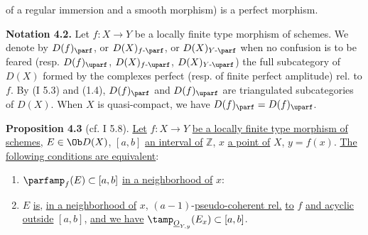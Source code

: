 %
of a regular immersion and a smooth morphism) is a perfect morphism.

\textbf{Notation 4.2.} Let \(f:X\to Y\) be a locally finite type morphism of schemes. We denote by \(D(f)_{\parf}\), or \(D(X)_{f\text{-}\parf}\), or \(D(X)_{Y\text{-}\parf}\) when no confusion is to be feared (resp. \(D(f)_{\uparf}\), \(D(X)_{f\text{-}\uparf}\), \(D(X)_{Y\text{-}\uparf}\)) the full subcategory of \(D(X)\) formed by the complexes perfect (resp. of finite perfect amplitude) rel. to \(f\). By (I 5.3) and (1.4), \(D(f)_{\parf}\) and \(D(f)_{\uparf}\) are triangulated subcategories of \(D(X)\). When \(X\) is quasi-compact, we have \(D(f)_{\parf}=D(f)_{\uparf}\).

\textbf{Proposition 4.3} (cf. I 5.8). \uline{Let} \(f:X\to Y\) \uline{be a locally finite type morphism of schemes}, \(E\in\Ob D(X)\), \([a,b]\) \uline{an interval of} \(\mathbb Z\), \(x\) \uline{a point of} \(X\), \(y=f(x)\). \uline{The following conditions are equivalent}:
\begin{enumerate}[label=(\roman*)]
\item \(\parfamp_f(E)\subset[a,b]\) \uline{in a neighborhood of} \(x\):
\item \(E\) \uline{is}, \uline{in a neighborhood of} \(x\), \((a-1)\)-\uline{pseudo-coherent rel.} \uline{to} \(f\) \uline{and acyclic outside} \([a,b]\), \uline{and we have} \(\tamp_{\underline{O}_{Y,y}}(E_x)\subset[a,b]\).
\end{enumerate}

